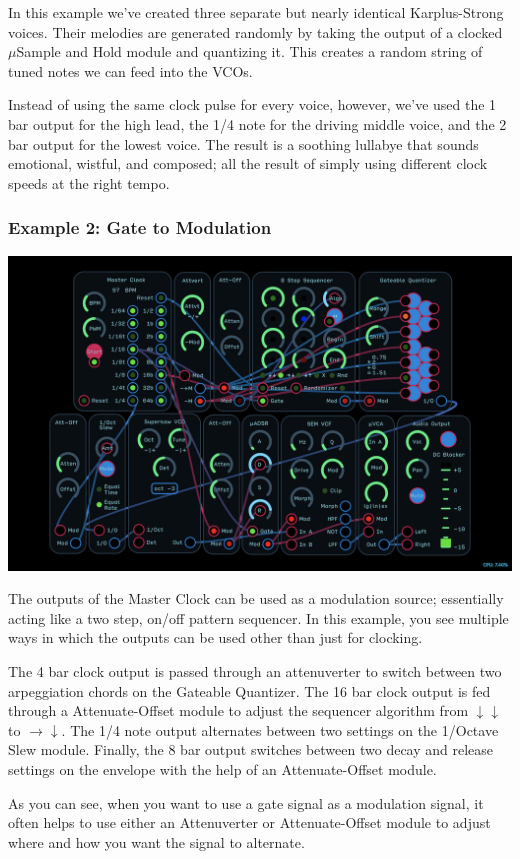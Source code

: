 \documentclass[11pt]{book}
\begin{document}
\begin{multicols*}{2}
In this example we've created three separate but nearly identical Karplus-Strong voices. Their melodies are generated randomly by taking the output of a clocked $\mu$Sample and Hold module and quantizing it. This creates a random string of tuned notes we can feed into the VCOs.

Instead of using the same clock pulse for every voice, however, we've used the 1 bar output for the high lead, the 1/4 note for the driving middle voice, and the 2 bar output for the lowest voice. The result is a soothing lullabye that sounds emotional, wistful, and composed; all the result of simply using different clock speeds at the right tempo.

\subsubsection*{Example 2: Gate to Modulation}

\begin{center}
\includegraphics[width=0.95\linewidth]{master-clock-fig2.png}
\end{center}

The outputs of the Master Clock can be used as a modulation source; essentially acting like a two step, on/off pattern sequencer. In this example, you see multiple ways in which the outputs can be used other than just for clocking.

The 4 bar clock output is passed through an attenuverter to switch between two arpeggiation chords on the Gateable Quantizer. The 16 bar clock output is fed through a Attenuate-Offset module to adjust the sequencer algorithm from $\downarrow \downarrow$ to $\rightarrow \downarrow$. The 1/4 note output alternates between two settings on the 1/Octave Slew module. Finally, the 8 bar output switches between two decay and release settings on the envelope with the help of an Attenuate-Offset module.

As you can see, when you want to use a gate signal as a modulation signal, it often helps to use either an Attenuverter or Attenuate-Offset module to adjust where and how you want the signal to alternate.

\end{multicols*}
\end{document}

